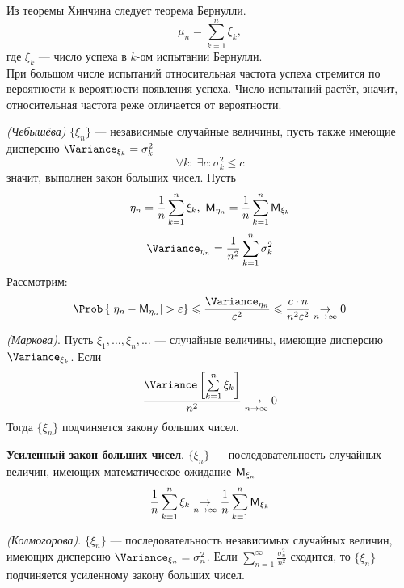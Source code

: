 Из теоремы Хинчина следует теорема Бернулли.
	\[
		\mu_n = \sum\limits_{k = 1}^{n} \xi_k,
	\]
	где $\xi_k$ --- число успеха в $k$-ом испытании Бернулли. \\
При большом числе испытаний относительная частота успеха стремится по вероятности к вероятности появления успеха. Число испытаний растёт, значит, относительная частота реже отличается от вероятности.
\begin{theorem}
	\textit{(Чебышёва)} $\{ \xi_n \}$ --- независимые случайные величины, пусть также имеющие дисперсию $\Variance_{\xi_k} = \sigma_k^2$
\[
	\forall k: \ \exists c: \sigma_k^2 \leqslant c
\]
значит, выполнен закон больших чисел. Пусть 
\[
	\eta_n = \frac{1}{n} \sum\limits_{k = 1}^{n} \xi_k, \ \mathsf{M}_{\eta_n} = \frac{1}{n} \sum\limits_{k = 1}^{n} \mathsf{M}_{\xi_k}
\]
\[
	\Variance_{\eta_n} = \frac{1}{n^2} \sum\limits_{k = 1}^{n} \sigma_k^2
\]
Рассмотрим:
\[
	\Prob \left\{ |\eta_n - \MExpect_{\eta_n} | > \varepsilon \right\} \leqslant \frac{\Variance_{\eta_n}}{\varepsilon^2} \leqslant \frac{c \cdot n}{n^2 \varepsilon^2} \underset{n \to \infty}{\rightarrow} 0
\]
\end{theorem}
\begin{theorem}
	\textit{(Маркова)}. Пусть $\xi_1, \ldots, \xi_n, \ldots$ --- случайные величины, имеющие дисперсию $\Variance_{\xi_k}$. Если
\[
	\frac{\Variance \left[ \sum\limits_{k = 1}^{n} \xi_k \right]}{n^2} \underset{n \to \infty}{\rightarrow} 0
\]
Тогда $\{ \xi_n \}$ подчиняется закону больших чисел.
\end{theorem}
\textbf{Усиленный закон больших чисел}. $\{ \xi_n \}$ --- последовательность случайных величин, имеющих математическое ожидание $\mathsf{M}_{\xi_n}$
\[
	\frac{1}{n} \sum\limits_{k = 1}^{n} {\xi_k} \underset{n \to \infty}{\rightarrow} \frac{1}{n} \sum\limits_{k = 1}^{n} \mathsf{M}_{\xi_k}
\]
\begin{theorem}
	\textit{(Колмогорова)}. $\{ \xi_n \}$ --- последовательность независимых случайных величин, имеющих дисперсию $\Variance_{\xi_n} = \sigma_n^2$. Если $\sum\limits_{n = 1}^{\infty} \frac{\sigma_n^2}{n^2}$ сходится, то $\{ \xi_n \}$ подчиняется усиленному закону больших чисел.
\end{theorem}


